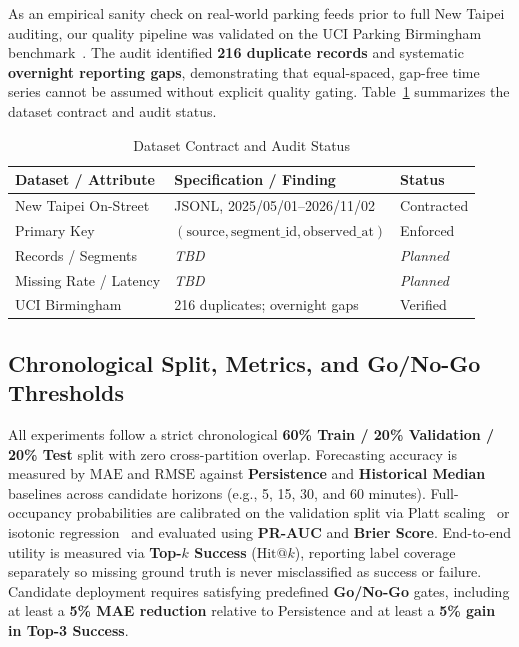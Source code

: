 \documentclass[conference,a4paper]{IEEEtran}
\newcommand{\TBD}{\textit{TBD}}
\newcommand{\Planned}{\textit{Planned}}
\begin{document}
As an empirical sanity check on real-world parking feeds prior to full New Taipei auditing, our quality pipeline was validated on the UCI Parking Birmingham benchmark~\cite{stolfi2017uci}. The audit identified \textbf{216 duplicate records} and systematic \textbf{overnight reporting gaps}, demonstrating that equal-spaced, gap-free time series cannot be assumed without explicit quality gating. Table~\ref{tab:data} summarizes the dataset contract and audit status.

\begin{table}[!t]
\caption{Dataset Contract and Audit Status}
\label{tab:data}
\centering
\scriptsize
\setlength{\tabcolsep}{3.5pt}
\begin{tabular}{p{2.1cm}p{3.6cm}l}
\toprule
\textbf{Dataset / Attribute} & \textbf{Specification / Finding} & \textbf{Status} \\
\midrule
New Taipei On-Street & JSONL, 2025/05/01--2026/11/02 & Contracted \\
Primary Key & $(\text{source}, \text{segment\_id}, \text{observed\_at})$ & Enforced \\
Records / Segments & \TBD & \Planned \\
Missing Rate / Latency & \TBD & \Planned \\
UCI Birmingham~\cite{stolfi2017uci} & 216 duplicates; overnight gaps & Verified \\
\bottomrule
\end{tabular}
\end{table}

\subsection{Chronological Split, Metrics, and Go/No-Go Thresholds}
All experiments follow a strict chronological \textbf{60\% Train / 20\% Validation / 20\% Test} split with zero cross-partition overlap. Forecasting accuracy is measured by $\mathrm{MAE}$ and $\mathrm{RMSE}$ against \textbf{Persistence} and \textbf{Historical Median} baselines across candidate horizons (e.g., 5, 15, 30, and 60 minutes). Full-occupancy probabilities are calibrated on the validation split via Platt scaling~\cite{platt1999} or isotonic regression~\cite{zadrozny2002} and evaluated using \textbf{PR-AUC} and \textbf{Brier Score}. End-to-end utility is measured via \textbf{Top-$k$ Success} ($\mathrm{Hit@}k$), reporting label coverage separately so missing ground truth is never misclassified as success or failure. Candidate deployment requires satisfying predefined \textbf{Go/No-Go} gates, including at least a \textbf{5\% MAE reduction} relative to Persistence and at least a \textbf{5\% gain in Top-3 Success}.
\end{document}
